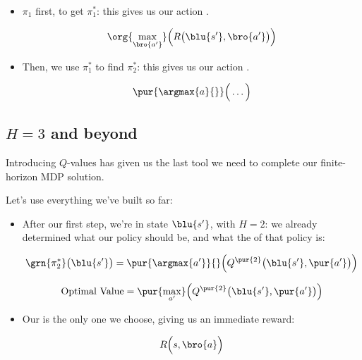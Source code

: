         \begin{itemize}
            \item $\pi_1$ first, to get $\pi_1^*$: this gives us our action .

            \begin{equation}
                \org{\max_{\bro{a'}}} \Big( R\big( \blu{s'},\bro{a'}\big) \Big) 
            \end{equation}
            
            \item Then, we use $\pi_1^*$ to find $\pi_2^*$: this gives us our action .

            \begin{equation}
                \pur{\argmax{a}{}} \Big( \dots \Big)
            \end{equation}
        \end{itemize}

    \subsection{$H=3$ and beyond}

        Introducing $Q$-values has given us the last tool we need to complete our finite-horizon MDP solution.

        Let's use everything we've built so far:

        \begin{itemize}
            \item After our first step, we're in state $\blu{s'}$, with $H=2$: we already determined what our policy should be, and what the  of that policy is:
                
            \begin{equation}
                \grn{\pi_2^*}\big(\blu{s'}\big) = 
                \pur{\argmax{a'}}{} \Big( 
                    Q^{\pur{2}}\big(\blu{s'}, \pur{a'} \big) 
                \Big)
            \end{equation}

            \begin{equation} 
                \text{Optimal Value} = 
                \pur{\max_{a'}} \Big( 
                    Q^{\pur{2}}\big(\blu{s'}, \pur{a'} \big) 
                \Big)
            \end{equation}

            \item Our  is the only one we choose, giving us an immediate reward:

            \begin{equation}
                R \Big( s,\bro{a} \Big)
            \end{equation}
        \end{itemize}

